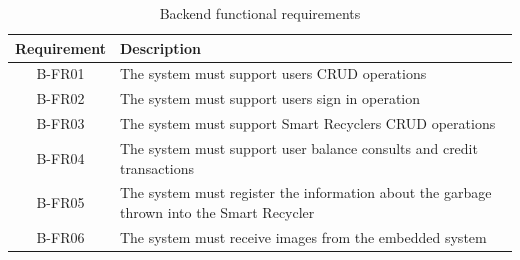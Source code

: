 \documentclass[a4paper,11pt]{article}
\begin{document}
\begin{table}[H]
  \caption{\small{Backend functional requirements}}
  \begin{center}
    \begin{tabular}{|c|p{95mm}|}
      \hline
      Requirement & Description                                                                               \\ \hline
      B-FR01      & The system must support users CRUD operations                                             \\ \hline
      B-FR02      & The system must support users sign in operation                                           \\ \hline
      B-FR03      & The system must support Smart Recyclers CRUD operations                                   \\ \hline
      B-FR04      & The system must support user balance consults and credit transactions                     \\ \hline
      B-FR05      & The system must register the information about the garbage thrown into the Smart Recycler \\ \hline
      B-FR06      & The system must receive images from the embedded system                                   \\ \hline
    \end{tabular}
  \end{center}
  \label{tab:back0}
\end{table}
\end{document}
